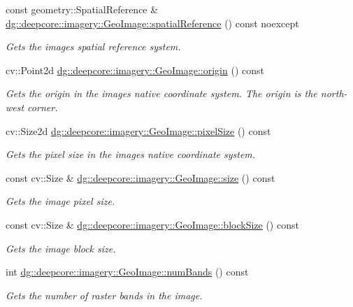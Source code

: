 \begin{DoxyCompactItemize}
const geometry\+::\+Spatial\+Reference \& \hyperlink{group___imagery_module_ga6953ff30d8f1791b3bcf886ad5fa0023}{dg\+::deepcore\+::imagery\+::\+Geo\+Image\+::spatial\+Reference} () const noexcept
\begin{DoxyCompactList}\small\item\em Gets the image\textquotesingle{}s spatial reference system. \end{DoxyCompactList}\item 
cv\+::\+Point2d \hyperlink{group___imagery_module_ga7c5610e7c7709c34712d1787c0009463}{dg\+::deepcore\+::imagery\+::\+Geo\+Image\+::origin} () const 
\begin{DoxyCompactList}\small\item\em Gets the origin in the image\textquotesingle{}s native coordinate system. The origin is the north-\/west corner. \end{DoxyCompactList}\item 
cv\+::\+Size2d \hyperlink{group___imagery_module_gad29b678ab57f8baf38e0d2060483c853}{dg\+::deepcore\+::imagery\+::\+Geo\+Image\+::pixel\+Size} () const 
\begin{DoxyCompactList}\small\item\em Gets the pixel size in the image\textquotesingle{}s native coordinate system. \end{DoxyCompactList}\item 
const cv\+::\+Size \& \hyperlink{group___imagery_module_gae6d433d58e379503c5556353caaff27d}{dg\+::deepcore\+::imagery\+::\+Geo\+Image\+::size} () const 
\begin{DoxyCompactList}\small\item\em Gets the image pixel size. \end{DoxyCompactList}\item 
const cv\+::\+Size \& \hyperlink{group___imagery_module_gac789478fe5998234df8f2f5ae85a6b85}{dg\+::deepcore\+::imagery\+::\+Geo\+Image\+::block\+Size} () const 
\begin{DoxyCompactList}\small\item\em Gets the image block size. \end{DoxyCompactList}\item 
int \hyperlink{group___imagery_module_gabbb556d9f5048249ae32197aeb90466c}{dg\+::deepcore\+::imagery\+::\+Geo\+Image\+::num\+Bands} () const 
\begin{DoxyCompactList}\small\item\em Gets the number of raster bands in the image. \end{DoxyCompactList}\item 

\end{DoxyCompactItemize}
